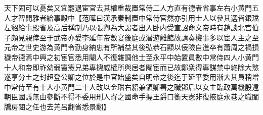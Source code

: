 天下固可以憂矣又宜罷退宦官去其權重裁置常侍二人方直有德者省事左右小黄門五人才智閒雅者給事殿中【范曄曰漢承秦制置中常侍官然亦引用士人以參其選皆銀璫左貂給事殿省及高后稱制乃以張卿為大謁者出入卧内受宣詔命文帝時有趙談北宫伯子頗見親倖至于武帝亦愛李延年帝數宴後庭或潜遊離館故請奏機事多以宦人主之至元帝之世史游為黄門令勤身納忠有所補益其後弘恭石顯以佞險自進卒有蕭周之禍損穢帝德焉中興之初宦官悉用閹人不復雜調他士至永平中始置員數中常侍四人小黄門十人和帝即祚幼弱竇憲兄弟專摠威權所與居者閹宦而已故鄭衆得專謀禁中終除大憝遂享分土之封超登公卿之位於是中官始盛矣自明帝之後迄于延平委用漸大其員稍增中常侍至有十人小黄門二十人改以金璫右貂兼領卿署之職鄧后以女主臨政萬機殷遠朝臣國議無由參斷不得不委用刑人寄之國命手握王爵口銜天憲非復掖庭永巷之職閨牖房闥之任也去羌呂翻省悉景翻】